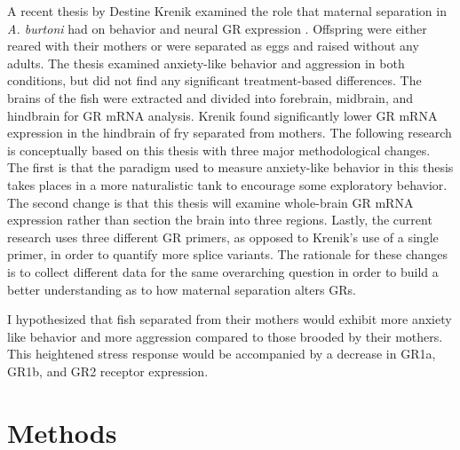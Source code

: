 \documentclass[12pt,twoside]{reedthesis}
\begin{document}
A recent thesis by Destine Krenik examined the role that maternal separation in
\textit{A. burtoni} had on behavior and neural GR
expression \citep{KrenikDestine2018Teom}. Offspring were either reared with their mothers or were separated as
eggs and raised without any adults. The thesis examined anxiety-like behavior and aggression in both
conditions, but did not find any significant treatment-based differences. The
brains of the fish were extracted and divided into forebrain, midbrain, and hindbrain for
GR mRNA analysis. Krenik found significantly lower GR mRNA expression in
the hindbrain of fry separated from mothers. The following research is
conceptually based on this thesis with three major methodological changes. The
first is that the paradigm used to measure anxiety-like behavior in this thesis takes places in
a more naturalistic tank to encourage some exploratory behavior. The second change is that this thesis will examine
whole-brain GR mRNA expression rather than section the brain into three regions.
Lastly,
the current research uses three different GR primers, as opposed to Krenik's use
of a single primer, in order to quantify
more splice variants. The rationale for these changes is to collect different
data for the same overarching question in order to build a better understanding
as to how
maternal separation alters GRs.

I hypothesized that fish separated from their mothers would exhibit more anxiety
like behavior and more aggression compared to those brooded by their mothers.
This heightened stress response would be accompanied by a decrease in GR1a,
GR1b, and GR2 receptor expression.

\chapter{Methods}
\end{document}

